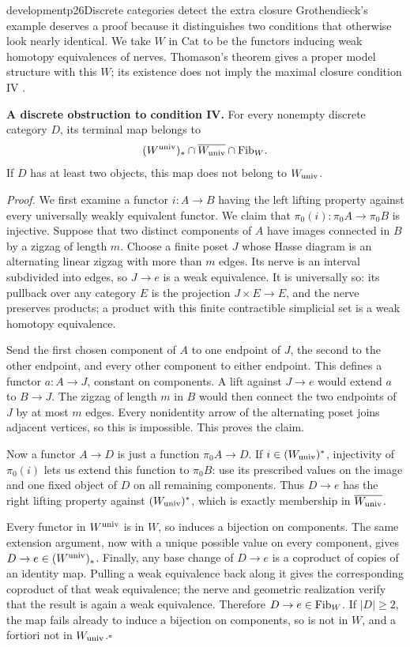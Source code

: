 \begin{dcomment}{development}{p26}{Discrete categories detect the extra closure}
Grothendieck's example deserves a proof because it distinguishes two conditions that otherwise look nearly identical. We take $W$ in $\mathrm{Cat}$ to be the functors inducing weak homotopy equivalences of nerves. Thomason's theorem gives a proper model structure with this $W$; its existence does not imply the maximal closure condition IV \citep[Theorem~4.9 and Corollary~5.5]{Thomason1980}.

\noindent\textbf{A discrete obstruction to condition IV.}\ours\quad
For every nonempty discrete category $D$, its terminal map belongs to
\[
 (W^{\mathrm{univ}})_*\cap\overline{W_{\mathrm{univ}}}\cap\mathrm{Fib}_W.
\]
If $D$ has at least two objects, this map does not belong to $W_{\mathrm{univ}}$.

\emph{Proof.} We first examine a functor $i:A\to B$ having the left lifting property against every universally weakly equivalent functor. We claim that $\pi_0(i):\pi_0A\to\pi_0B$ is injective. Suppose that two distinct components of $A$ have images connected in $B$ by a zigzag of length $m$. Choose a finite poset $J$ whose Hasse diagram is an alternating linear zigzag with more than $m$ edges. Its nerve is an interval subdivided into edges, so $J\to e$ is a weak equivalence. It is universally so: its pullback over any category $E$ is the projection $J\times E\to E$, and the nerve preserves products; a product with this finite contractible simplicial set is a weak homotopy equivalence.

Send the first chosen component of $A$ to one endpoint of $J$, the second to the other endpoint, and every other component to either endpoint. This defines a functor $a:A\to J$, constant on components. A lift against $J\to e$ would extend $a$ to $B\to J$. The zigzag of length $m$ in $B$ would then connect the two endpoints of $J$ by at most $m$ edges. Every nonidentity arrow of the alternating poset joins adjacent vertices, so this is impossible. This proves the claim.

Now a functor $A\to D$ is just a function $\pi_0A\to D$. If $i\in(W_{\mathrm{univ}})^*$, injectivity of $\pi_0(i)$ lets us extend this function to $\pi_0B$: use its prescribed values on the image and one fixed object of $D$ on all remaining components. Thus $D\to e$ has the right lifting property against $(W_{\mathrm{univ}})^*$, which is exactly membership in $\overline{W_{\mathrm{univ}}}$.

Every functor in $W^{\mathrm{univ}}$ is in $W$, so induces a bijection on components. The same extension argument, now with a unique possible value on every component, gives $D\to e\in(W^{\mathrm{univ}})_*$. Finally, any base change of $D\to e$ is a coproduct of copies of an identity map. Pulling a weak equivalence back along it gives the corresponding coproduct of that weak equivalence; the nerve and geometric realization verify that the result is again a weak equivalence. Therefore $D\to e\in\mathrm{Fib}_W$. If $|D|\geq2$, the map fails already to induce a bijection on components, so is not in $W$, and a fortiori not in $W_{\mathrm{univ}}$.\hfill$\square$


\end{dcomment}
